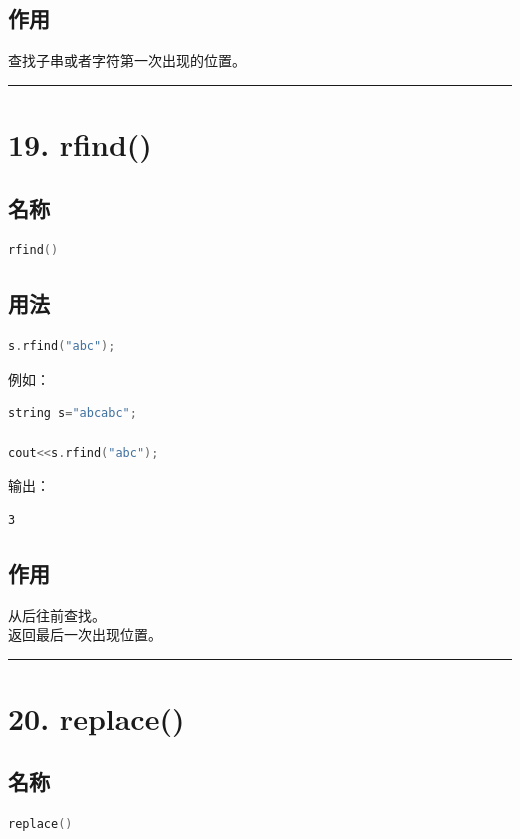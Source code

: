 \documentclass[10pt,twocolumn]{extarticle}
\begin{document}
\subsection{作用}
查找子串或者字符第一次出现的位置。

\noindent\rule{\linewidth}{0.4pt}

\section{19. rfind()}

\subsection{名称}
\begin{lstlisting}[language=C++]
rfind()
\end{lstlisting}

\subsection{用法}
\begin{lstlisting}[language=C++]
s.rfind("abc");
\end{lstlisting}
例如：
\begin{lstlisting}[language=C++]
string s="abcabc";

cout<<s.rfind("abc");
\end{lstlisting}
输出：
\begin{lstlisting}
3
\end{lstlisting}

\subsection{作用}
从后往前查找。\\
返回最后一次出现位置。

\noindent\rule{\linewidth}{0.4pt}

\section{20. replace()}

\subsection{名称}
\begin{lstlisting}[language=C++]
replace()
\end{lstlisting}
\end{document}
